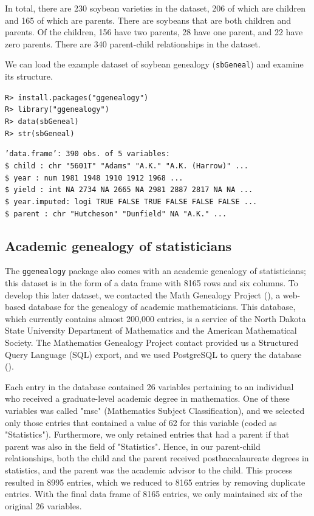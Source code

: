 \documentclass[11pt,a4paper,oldfontcommands,openany]{memoir}
\DeclareRobustCommand{\mybox}[2][gray!15]{%
\begin{tcolorbox}[   %
        breakable,
        left=0pt,
        right=0pt,
        top=0pt,
        bottom=0pt,
        colback=#1,
        colframe=#1,
        width=\dimexpr\textwidth\relax, 
        enlarge left by=0mm,
        boxsep=5pt,
        arc=0pt,outer arc=0pt,
        ]
        #2
\end{tcolorbox}
}
\numberwithin{equation}{section} %
\newcommand{\code}[1]{{\texttt{#1}}}
\newcommand{\pkg}[1]{{\texttt{#1}}}
\begin{document}
In total, there are 230 soybean varieties in the dataset, 206 of which are children and 165 of which are parents. There are soybeans that are both children and parents. Of the children, 156 have two parents, 28 have one parent, and 22 have zero parents. There are 340 parent-child relationships in the dataset.

We can load the example dataset of soybean genealogy (\code{sbGeneal}) and examine its structure. 

\mybox{
\texttt{R> install.packages("ggenealogy")}\\
\texttt{R> library("ggenealogy")}\\
\texttt{R> data(sbGeneal)}\\
\texttt{R> str(sbGeneal)}
}

\mybox[green!10]{
\texttt{'data.frame':	390 obs. of  5 variables:}\\
\texttt{\$ child       : chr  "5601T" "Adams" "A.K." "A.K. (Harrow)" ...}\\
\texttt{\$ year        : num  1981 1948 1910 1912 1968 ...}\\
\texttt{\$ yield       : int  NA 2734 NA 2665 NA 2981 2887 2817 NA NA ...}\\
\texttt{\$ year.imputed: logi  TRUE FALSE TRUE FALSE FALSE FALSE ...}\\
\texttt{\$ parent      : chr  "Hutcheson" "Dunfield" NA "A.K." ...}
}

\subsection{Academic genealogy of statisticians}

The \pkg{ggenealogy} package also comes with an academic genealogy of statisticians; this dataset is in the form of a data frame with 8165 rows and six columns. To develop this later dataset, we contacted the Math Genealogy Project (\citealt{mgp}), a web-based database for the genealogy of academic mathematicians. This database, which currently contains almost 200,000 entries, is a service of the North Dakota State University Department of Mathematics and the American Mathematical Society. The Mathematics Genealogy Project contact provided us a Structured Query Language (SQL) export, and we used PostgreSQL to query the database (\citealt{psql}).

Each entry in the database contained 26 variables pertaining to an individual who received a graduate-level academic degree in mathematics. One of these variables was called "msc" (Mathematics Subject Classification), and we selected only those entries that contained a value of 62 for this variable (coded as "Statistics"). Furthermore, we only retained entries that had a parent if that parent was also in the field of "Statistics". Hence, in our parent-child relationships, both the child and the parent received postbaccalaureate degrees in statistics, and the parent was the academic advisor to the child. This process resulted in 8995 entries, which we reduced to 8165 entries by removing duplicate entries. With the final data frame of 8165 entries, we only maintained six of the original 26 variables. 
\end{document}
